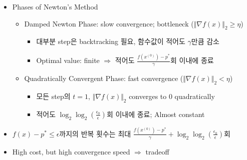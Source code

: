 \begin{itemize}
    \item Phases of Newton's Method
    \begin{itemize}
        \item Damped Newton Phase: slow convergence; bottleneck ($\Vert\nabla f(x)\Vert_2\geq\eta$)
        \begin{itemize}
            \item 대부분 step은 backtracking 필요, 함수값이 적어도 $\gamma$만큼 감소
            \item Optimal value: finite $\Rightarrow$ 적어도 $\frac{f(x^{(0)})-p^\ast}{\gamma}$회 이내에 종료
        \end{itemize}
        \item Quadratically Convergent Phase: fast convergence ($\Vert\nabla f(x)\Vert_2<\eta$)
        \begin{itemize}
            \item 모든 step의 $t=1$, $\Vert\nabla f(x)\Vert_2$ converges to 0 quadratically
            \item 적어도 $\log_2\log_2\left(\frac{\epsilon_0}{\epsilon}\right)$회 이내에 종료; Almost constant
        \end{itemize}
    \end{itemize}
    \item $f(x)-p^\ast\leq\epsilon$까지의 반복 횟수는 최대 $\frac{f(x^{(0)})-p^\ast}{\gamma}+\log_2\log_2\left(\frac{\epsilon_0}{\epsilon}\right)$회
    \item High cost, but high convergence speed $\Rightarrow$ tradeoff
\end{itemize}

